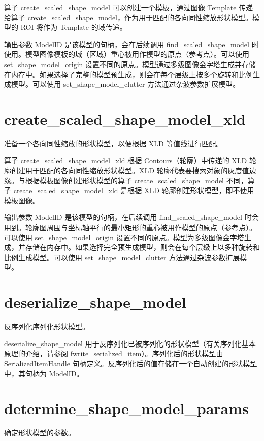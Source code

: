 \documentclass{article}
\begin{document}
算子 create\_scaled\_shape\_model 可以创建一个模板，通过图像 Template 传递给算子 create\_scaled\_shape\_model，作为用于匹配的各向同性缩放形状模型。模型的 ROI 将作为 Template 的域传递。

输出参数 ModelID 是该模型的句柄，会在后续调用 find\_scaled\_shape\_model 时使用。模型图像模板的域（区域）重心被用作模型的原点（参考点）。可以使用 set\_shape\_model\_origin 设置不同的原点。模型通过多级图像金字塔生成并存储在内存中。如果选择了完整的模型预生成，则会在每个层级上按多个旋转和比例生成模型。可以使用 set\_shape\_model\_clutter 方法通过杂波参数扩展模型。

\section{create\_scaled\_shape\_model\_xld}
准备一个各向同性缩放的形状模型，以便根据 XLD 等值线进行匹配。

算子 create\_scaled\_shape\_model\_xld 根据 Contours（轮廓）中传递的 XLD 轮廓创建用于匹配的各向同性缩放形状模型。XLD 轮廓代表要搜索对象的灰度值边缘。与根据模板图像创建形状模型的算子 create\_scaled\_shape\_model 不同，算子 create\_scaled\_shape\_model\_xld 是根据 XLD 轮廓创建形状模型，即不使用模板图像。

输出参数 ModelID 是该模型的句柄，在后续调用 find\_scaled\_shape\_model 时会用到。轮廓图周围与坐标轴平行的最小矩形的重心被用作模型的原点（参考点）。可以使用 set\_shape\_model\_origin 设置不同的原点。模型为多级图像金字塔生成，并存储在内存中。如果选择完全预生成模型，则会在每个层级上以多种旋转和比例生成模型。可以使用 set\_shape\_model\_clutter 方法通过杂波参数扩展模型。

\section{deserialize\_shape\_model}
反序列化序列化形状模型。

deserialize\_shape\_model 用于反序列化已被序列化的形状模型（有关序列化基本原理的介绍，请参阅 fwrite\_serialized\_item）。序列化后的形状模型由 SerializedItemHandle 句柄定义。反序列化后的值存储在一个自动创建的形状模型中，其句柄为 ModelID。

\section{determine\_shape\_model\_params}
确定形状模型的参数。
\end{document}
